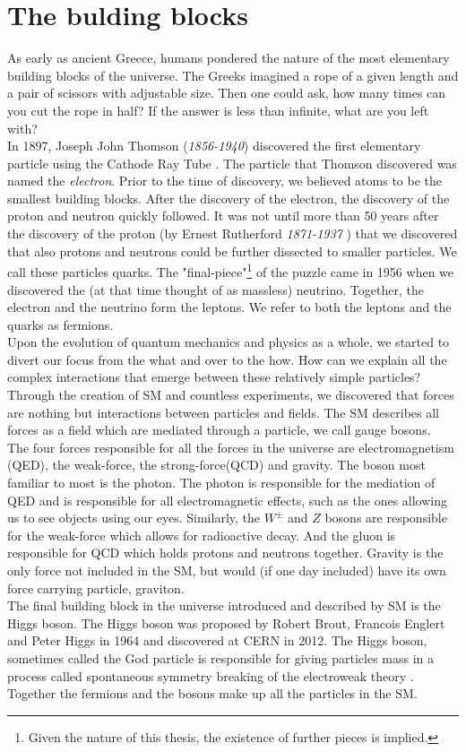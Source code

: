 \section{The bulding blocks}
As early as ancient Greece, humans pondered the nature of the most elementary building blocks of
the universe. The Greeks imagined a rope of a given length and a pair of scissors with adjustable size.
Then one could ask, how many times can you cut the rope in half? If the answer is less than infinite,
what are you left with?
\\
In 1897, Joseph John Thomson (\emph{1856-1940}) discovered the first elementary particle using the Cathode Ray Tube \cite{JJ}. 
The particle that Thomson discovered was named the \emph{electron}. Prior to the time of discovery, we believed atoms to 
be the smallest building blocks. After the discovery of the electron, the discovery of the 
proton and neutron quickly followed. It was not until more than 50 years after the discovery of 
the proton (by Ernest Rutherford \emph{1871-1937} \cite{Rutherfoord}) that we discovered that also protons and neutrons could be further
dissected to smaller particles. We call these particles quarks. The "final-piece"\footnote{Given the
nature of this thesis, the existence of further pieces is implied.} of the puzzle came
in 1956 \cite{Reines} when we discovered the (at that time thought of as massless) neutrino. Together, the 
electron and the neutrino form the leptons. We refer to both the leptons and the quarks as fermions.
\\
Upon the evolution of quantum mechanics and physics as a whole, we started to divert
our focus from the what and over to the how. How can we explain all the complex interactions
that emerge between these relatively simple particles? Through the creation of \ac{SM} and countless 
experiments, we discovered that forces are nothing but interactions between particles and fields.
The \ac{SM} describes all forces as a field which are mediated through a particle, we call gauge bosons. 
\\
The four forces responsible for all the forces in the universe are electromagnetism (\ac{QED}), the weak-force, 
the strong-force(\ac{QCD}) and gravity. The boson most familiar to most is the photon. The photon is responsible 
for the mediation of \ac{QED} and is responsible for all electromagnetic effects, such as the ones allowing
us to see objects using our eyes. Similarly, the $W^{\pm}$ and $Z$ bosons are responsible for the weak-force which
allows for radioactive decay. And the gluon is responsible for \ac{QCD} which holds protons and 
neutrons together. Gravity is the only force not included in the SM, but would (if one day included)
have its own force carrying particle, graviton. 
\\
The final building block in the universe introduced and described by \ac{SM} is the Higgs boson.
The Higgs boson was proposed by Robert Brout, Francois Englert and Peter Higgs in 1964 and discovered at CERN in 2012. The Higgs boson,
sometimes called the God particle is responsible for giving particles mass in a process called
spontaneous symmetry breaking of the electroweak theory \cite{SSB}. Together the fermions and the bosons make up all the 
particles in the \ac{SM}.
